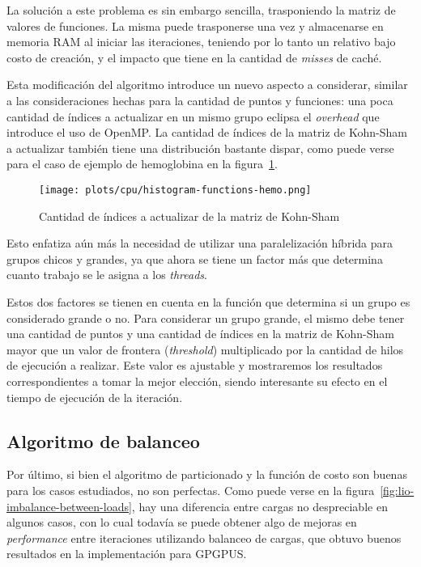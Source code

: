 La soluci\'on a este problema es sin embargo sencilla, trasponiendo la matriz de
valores de funciones. La misma puede trasponerse una vez y almacenarse en memoria
RAM al iniciar las iteraciones, teniendo por lo tanto un relativo bajo costo de
creaci\'on, y el impacto que tiene en la cantidad de \textit{misses} de cach\'e.

Esta modificaci\'on del algoritmo introduce un nuevo aspecto a considerar, similar
a las consideraciones hechas para la cantidad de puntos y funciones: una poca
cantidad de \'indices a actualizar en un mismo grupo eclipsa el \textit{overhead}
que introduce el uso de OpenMP. La cantidad de \'indices de la matriz de Kohn-Sham a
actualizar tambi\'en tiene una distribuci\'on bastante dispar, como puede verse
para el caso de ejemplo de hemoglobina en la figura~\ref{fig:histogram-indexes-hemo}.

\begin{figure}[htbp]
   \centering
   \texttt{[image: plots/cpu/histogram-functions-hemo.png]}
   \caption{Cantidad de \'indices a actualizar de la matriz de Kohn-Sham}
   \label{fig:histogram-indexes-hemo}
\end{figure}

Esto enfatiza a\'un m\'as la necesidad de utilizar una paralelizaci\'on h\'ibrida
para grupos chicos y grandes, ya que ahora se tiene un factor m\'as que determina
cuanto trabajo se le asigna a los \textit{threads}.

Estos dos factores se tienen en cuenta en la funci\'on que determina si un grupo
es considerado grande o no. Para considerar un grupo grande, el mismo debe tener
una cantidad de puntos y una cantidad de \'indices en la matriz de Kohn-Sham mayor que
un valor de frontera (\textit{threshold}) multiplicado por la cantidad de hilos de
ejecuci\'on a realizar. Este valor es ajustable y mostraremos los resultados
correspondientes a tomar la mejor elecci\'on, siendo interesante su efecto en el
tiempo de ejecuci\'on de la iteraci\'on.

\subsection{Algoritmo de balanceo}

Por \'ultimo, si bien el algoritmo de particionado y la funci\'on de costo son
buenas para los casos estudiados, no son perfectas. Como puede verse en la
figura~\ref{fig:lio-imbalance-between-loads}, hay una diferencia entre cargas
no despreciable en algunos casos, con lo cual todav\'ia se puede obtener algo de
mejoras en \textit{performance} entre iteraciones utilizando balanceo de cargas,
que obtuvo buenos resultados en la implementaci\'on para GPGPUS.

